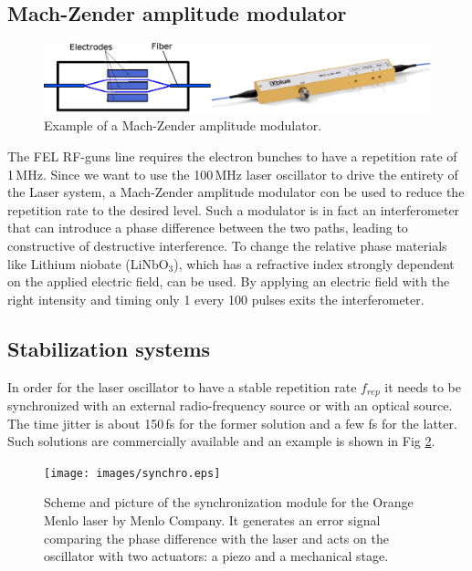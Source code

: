 \subsection{Mach-Zender amplitude modulator}
\begin{figure}
	\centering
	\includegraphics[width=0.9\linewidth]{images/mach.eps}
	\caption{Example of a Mach-Zender amplitude modulator.}
	\label{fig:mach}
\end{figure}
The FEL RF-guns line requires the electron bunches to have a repetition rate of 1\,MHz. Since we want to use the 100\,MHz laser oscillator to drive the entirety of the Laser system, a Mach-Zender amplitude modulator con be used to reduce the repetition rate to the desired level. Such a modulator is in fact an interferometer that can introduce a phase difference between the two paths, leading to constructive of destructive interference. To change the relative phase materials like Lithium niobate (LiNbO$_3$), which has a refractive index strongly dependent on the applied electric field, can be used. By applying an electric field with the right intensity and timing only 1 every 100 pulses exits the interferometer.

\subsection{Stabilization systems}
In order for the laser oscillator to have a stable repetition rate $f_{rep}$ it needs to be synchronized with an external radio-frequency source or with an optical source. The time jitter is about 150\,fs for the former solution and a few fs for the latter. Such solutions are commercially available and an example is shown in Fig \ref{fig:synchro}.
\begin{figure}
	\centering
	\texttt{[image: images/synchro.eps]}
	\caption{Scheme and picture of the synchronization module for the Orange Menlo laser by Menlo Company. It generates an error signal comparing the phase difference with the laser and acts on the oscillator with two actuators: a piezo and a mechanical stage.}
	\label{fig:synchro}
\end{figure}

